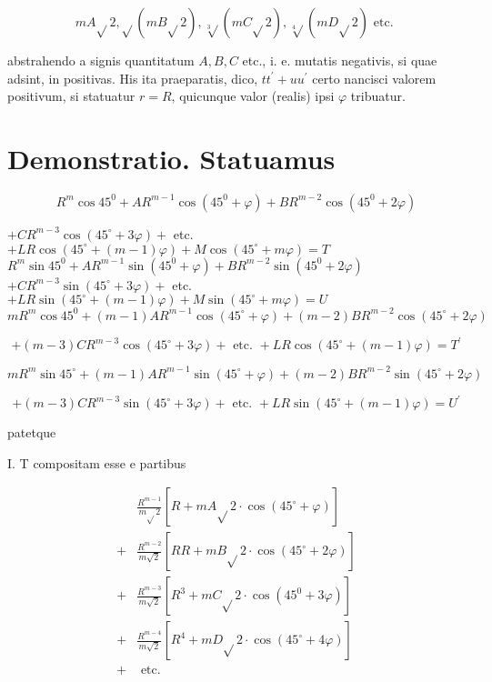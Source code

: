 \documentclass[10pt]{article}
\begin{document}
\[
m A \sqrt{ } 2, \sqrt{ }(m B \sqrt{ } 2), \sqrt[3]{ }(m C \sqrt{ } 2), \sqrt[4]{ }(m D \sqrt{ } 2) \text { etc. }
\]

abstrahendo a signis quantitatum \(A, B, C\) etc., i. e. mutatis negativis, si quae adsint, in positivas. His ita praeparatis, dico, \(t t^{\prime}+u u^{\prime}\) certo nancisci valorem positivum, si statuatur \(r=R\), quicunque valor (realis) ipsi \(\varphi\) tribuatur.

\section*{Demonstratio. Statuamus}
\[
R^{m} \cos 45^{0}+A R^{m-1} \cos \left(45^{0}+\varphi\right)+B R^{m-2} \cos \left(45^{0}+2 \varphi\right)
\]

\(+C R^{m-3} \cos \left(45^{\circ}+3 \varphi\right)+\) etc. \(+L R \cos \left(45^{\circ}+(m-1) \varphi\right)+M \cos \left(45^{\circ}+m \varphi\right)=T\) \(R^{m} \sin 45^{0}+A R^{m-1} \sin \left(45^{0}+\varphi\right)+B R^{m-2} \sin \left(45^{0}+2 \varphi\right)\) \(+C R^{m-3} \sin \left(45^{\circ}+3 \varphi\right)+\) etc. \(+L R \sin \left(45^{\circ}+(m-1) \varphi\right)+M \sin \left(45^{\circ}+m \varphi\right)=U\) \(m R^{m} \cos 45^{0}+(m-1) A R^{m-1} \cos \left(45^{\circ}+\varphi\right)+(m-2) B R^{m-2} \cos \left(45^{\circ}+2 \varphi\right)\)

\[
+(m-3) C R^{m-3} \cos \left(45^{\circ}+3 \varphi\right)+\text { etc. }+L R \cos \left(45^{\circ}+(m-1) \varphi\right)=T^{\prime}
\]

\(m R^{m} \sin 45^{\circ}+(m-1) A R^{m-1} \sin \left(45^{\circ}+\varphi\right)+(m-2) B R^{m-2} \sin \left(45^{\circ}+2 \varphi\right)\)

\[
+(m-3) C R^{m-3} \sin \left(45^{\circ}+3 \varphi\right)+\text { etc. }+L R \sin \left(45^{\circ}+(m-1) \varphi\right)=U^{\prime}
\]

patetque

I. T compositam esse e partibus

\[
\begin{aligned}
& \frac{R^{m-1}}{m \sqrt{ } 2}\left[R+m A \sqrt{ } 2 \cdot \cos \left(45^{\circ}+\varphi\right)\right] \\
+ & \frac{R^{m-2}}{m \sqrt{2}}\left[R R+m B \sqrt{ } 2 \cdot \cos \left(45^{\circ}+2 \varphi\right)\right] \\
+ & \frac{R^{m-3}}{m \sqrt{2}}\left[R^{3}+m C \sqrt{ } 2 \cdot \cos \left(45^{0}+3 \varphi\right)\right] \\
+ & \frac{R^{m-4}}{m \sqrt{2}}\left[R^{4}+m D \sqrt{ } 2 \cdot \cos \left(45^{\circ}+4 \varphi\right)\right] \\
+ & \text { etc. }
\end{aligned}
\]
\end{document}
